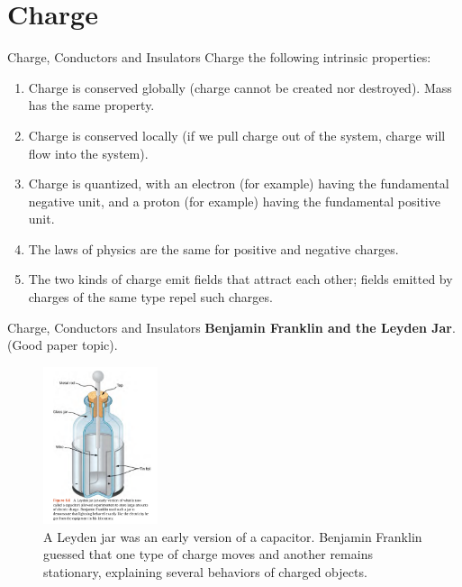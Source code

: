 \documentclass{beamer}
\begin{document}
\section{Charge}

\begin{frame}{Charge, Conductors and Insulators}
\small
Charge the following intrinsic properties: \\ \vspace{0.25cm}
\begin{enumerate}
\item Charge is conserved globally (charge cannot be created nor destroyed).  Mass has the same property.
\item Charge is conserved locally (if we pull charge out of the system, charge will flow into the system).
\item Charge is quantized, with an electron (for example) having the fundamental negative unit, and a proton (for example) having the fundamental positive unit.
\item The laws of physics are the same for positive and negative charges.
\item The two kinds of charge emit fields that attract each other; fields emitted by charges of the same type repel such charges.
\end{enumerate}
\end{frame}

\begin{frame}{Charge, Conductors and Insulators}
\textbf{Benjamin Franklin and the Leyden Jar}.  (Good paper topic).
\begin{figure}
\centering
\includegraphics[width=0.3\textwidth]{figures/leyden.png}
\caption{\label{fig:leyden} A Leyden jar was an early version of a capacitor.  Benjamin Franklin guessed that one type of charge moves and another remains stationary, explaining several behaviors of charged objects.}
\end{figure}
\end{frame}
\end{document}
